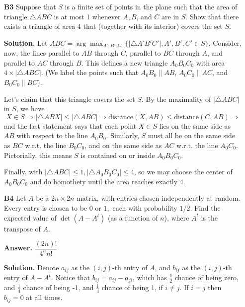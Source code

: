 \documentclass[11pt,a4paper]{article}
\newcommand{\<}{\langle}
\renewcommand{\>}{\rangle}
\begin{document}
\begin{enumerate}
	\item[\textbf{B3}] Suppose that $S$ is a finite set of points in the plane such that the area of triangle $\triangle ABC$ is at most 1 
	whenever $A, B$, and $C$ are in $S$. 
	Show that there exists a triangle of area 4 that (together with its interior) covers the set $S$.
	
	\textbf{Solution.} 
	Let $ABC=\arg\max_{A', B', C'} \{|\triangle A'B'C'|, A', B', C'\in S\}$. 
	Consider, now, the lines parallel to $AB$ through $C$, 
	parallel to $BC$ through $A$, and parallel to $AC$ through $B$. 
	This defines a new triangle $A_0B_0C_0$ with area $4\times |\triangle ABC|$. 
	(We label the points such that $A_0B_0\parallel AB$, $A_0C_0\parallel AC$, and $B_0C_0\parallel BC$). 
	
	Let's claim that this triangle covers the set $S$. 
	By the maximality of $|\triangle ABC|$ in $S$, we have 
	\[
	X\in S\Rightarrow |\triangle ABX|\le |\triangle ABC|\Rightarrow \text{distance}(X, AB)\le \text{distance}(C, AB)\Rightarrow 
	\]
	and the last statement says that each point $X\in S$ lies on the same side as $AB$ with respect to the line $A_0B_0$. 
	Similarly, $S$ must all be on the same side as $BC$ w.r.t. the line $B_0C_0$, 
	and on the same side as $AC$ w.r.t. the line $A_0C_0$. 
	Pictorially, this means $S$ is contained on or inside $A_0B_0C_0$. 
	
	Finally, with $|\triangle ABC|\le 1, |\triangle A_0B_0C_0|\le 4$, 
	so we may choose the center of $A_0B_0C_0$ and do homothety until the area reaches exactly 4. 
	
	\item[\textbf{B4}]Let $A$ be a $2n\times 2n$ matrix, with entries chosen independently at random. Every entry is chosen to be $0$ or $1,$ each with probability $1/2.$ Find the expected value of $\det(A-A^t)$ (as a function of $n$), where $A^t$ is the transpose of $A.$
	
	\textbf{Answer.} $\dfrac{(2n)!}{4^n n!}$
	
	\textbf{Solution.} Denote $a_{ij}$ as the $(i, j)$-th entry of $A$, and $b_{ij}$ as the $(i, j)$-th entry of $A-A^t$. Notice that $b_{ij}=a_{ij}-a_{ji}$, which has $\frac 12$ chance of being zero, and $\frac 14$ chance of being -1, and $\frac 14$ chance of being 1, if $i\neq j$. If $i=j$ then $b_{ij}=0$ at all times. 
	

\end{enumerate}
\end{document}
